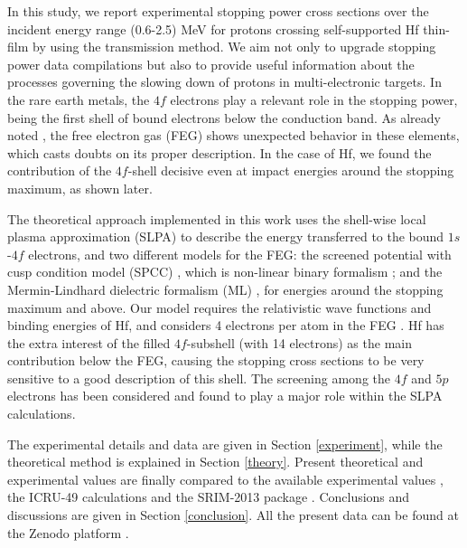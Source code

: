 \documentclass[aps,pra,reprint,groupedaddress]{revtex4-1}
\begin{document}
In this study, we report experimental stopping power cross sections over the incident energy range (0.6-2.5) MeV for protons crossing self-supported Hf thin-film by using the transmission method. We aim not only to upgrade stopping power data compilations \cite{HPaul03,mondim17} but also to provide useful information about the processes governing the slowing down of protons in multi-electronic targets. In the rare earth metals, the $4f$ electrons play a relevant role in the stopping power, being the first shell of bound electrons below the conduction band. As already noted \cite{Roth17}, the free electron gas (FEG) shows unexpected %
behavior in these elements, which casts %
doubts on its proper description. In the case of Hf, we found the contribution of the $4f$-shell decisive even at impact energies around the stopping maximum, as shown later.

The theoretical approach implemented in this work uses the shell-wise local plasma approximation (SLPA) \cite{mon13} to describe the energy transferred to the bound $1s$-$4f$ electrons, and two different models for the FEG: the screened potential with cusp condition model (SPCC) \cite{mon17}, which is non-linear binary formalism%
; and the Mermin-Lindhard dielectric formalism (ML) \cite{Mermin}, for energies around the stopping maximum and above. Our model requires 
the relativistic wave functions and binding energies of Hf, and considers 4 electrons per atom in the  FEG \cite{mendez2019}. 
Hf has the extra interest of the filled $4f$-subshell (with 14 electrons) as the main contribution below the FEG, causing the stopping cross sections to be very sensitive to a good description of this shell. The screening among the $4f$ and $5p$ electrons has been considered and found to play a major role within the SLPA calculations.

The experimental details and data are given in Section \ref{experiment}, while the theoretical method is explained in Section \ref{theory}. Present theoretical and experimental values are finally compared to the available experimental values \cite{Sirotinin},  the ICRU-49 calculations \cite{ICRU49} and the SRIM-2013 package \cite{Ziegler01}. Conclusions and discussions are given in Section \ref{conclusion}. All the present data can be found at the Zenodo platform \cite{zenodo}.



\end{document}
